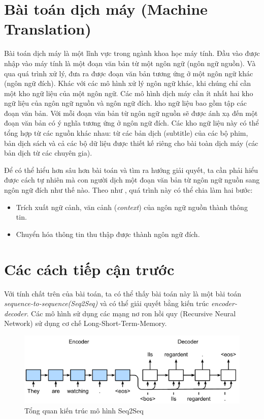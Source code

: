 \section{Bài toán dịch máy (Machine Translation)}

Bài toán dịch máy là một lĩnh vực trong ngành khoa học máy tính. Đầu vào được nhập vào máy tính là một đoạn văn bản từ một ngôn ngữ (ngôn ngữ nguồn). Và qua quá trình xử lý, đưa ra được đoạn văn bản tương ứng ở một ngôn ngữ khác (ngôn ngữ đích). Khác với các mô hình xử lý ngôn ngữ khác, khi chúng chỉ cần một kho ngữ liệu của một ngôn ngữ. Các mô hình dịch máy cần ít nhất hai kho ngữ liệu của ngôn ngữ nguồn và ngôn ngữ đích. kho ngữ liệu bao gồm tập các đoạn văn bản. Với mỗi đoạn văn bản từ ngôn ngữ nguồn sẽ được ánh xạ đến một đoạn văn bản có ý nghĩa tương ứng ở ngôn ngữ đích. Các kho ngữ liệu này có thể tổng hợp từ các nguồn khác nhau: từ các bản dịch (subtitle) của các bộ phim, bản dịch sách và cả các bộ dữ liệu được thiết kế riêng cho bài toàn dịch máy (các bản dịch từ các chuyên gia).

Để có thể hiểu hơn sâu hơn bài toán và tìm ra hướng giải quyết, ta cần phải hiểu được cách tự nhiên mà con người dịch một đoạn văn bản từ ngôn ngữ nguồn sang ngôn ngữ đích như thế nào. Theo như \cite{2014arXiv1409.0473B}, quá trình này có thể chia làm hai bước:
\begin{itemize}
	\item Trích xuất ngữ cảnh, văn cảnh (\textit{context}) của ngôn ngữ nguồn thành thông tin.
	\item Chuyển hóa thông tin thu thập được thành ngôn ngữ đích.
\end{itemize}

\section{Các cách tiếp cận trước}

Với tính chất trên của bài toán, ta có thể thấy bài toán này là một bài toán \textit{sequence-to-sequence(Seq2Seq)} và có thể giải quyết bằng kiến trúc \textit{encoder-decoder}. Các mô hình sử dụng các mạng nơ ron hồi quy (Recursive Neural Network) sử dụng cơ chế Long-Short-Term-Memory.

\begin{figure}[H]
    \begin{center}
        \includegraphics[scale=0.8]{images/seq2seq}
        \caption{Tổng quan kiến trúc mô hình Seq2Seq \cite{seq2seq}}
        \label{fig:seq2seq}
    \end{center}
\end{figure}


